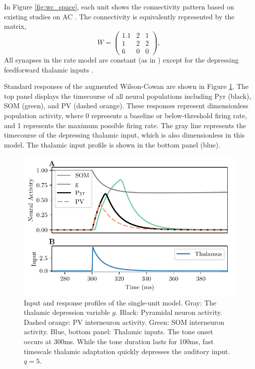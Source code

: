 \documentclass[a4paper,11pt]{article}
\begin{document}
In Figure \ref{fig:wc_space}, each unit shows the connectivity pattern based on existing studies on AC \cite{pfeffer2013inhibition}. The connectivity is equivalently represented by the matrix,
\begin{equation}\label{eq:ssa_weights}
 W = \left(\begin{matrix}
      1.1 & 2 & 1\\
      1   & 2 & 2\\
      6   & 0 & 0
     \end{matrix}\right),
\end{equation}
All synapses in the rate model are constant (as in \cite{mill2011neurocomputational}) except for the depressing feedforward thalamic inputs \cite{lee2008synaptic}.

Standard responses of the augmented Wilson-Cowan are shown in Figure \ref{fig:awc}. The top panel displays the timecourse of all neural populations including Pyr (black), SOM (green), and PV (dashed orange). These responses represent dimensionless population activity, where 0 represents a baseline or below-threshold firing rate, and 1 represents the maximum possible firing rate. The gray line represents the timecourse of the depressing thalamic input, which is also dimensionless in this model. The thalamic input profile is 
shown in the bottom panel (blue).

\begin{figure}[ht!]
\centering
\includegraphics[width=.75\textwidth]{rate_responses.pdf}
 \caption{Input and response profiles of the single-unit model. Gray: The thalamic depression variable $g$. Black: Pyramidal neuron activity. Dashed orange: PV interneuron activity. Green: SOM interneuron activity. Blue, bottom panel: Thalamic inputs. The tone onset occurs at 300ms. While the tone duration lasts for 100ms, fast timescale thalamic adaptation quickly depresses the auditory input. $q=5$.}\label{fig:awc}
\end{figure}
\end{document}
